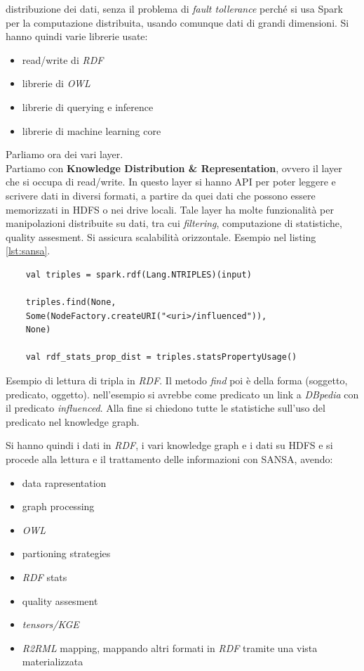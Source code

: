 \documentclass[a4paper,12pt, oneside]{book}
\begin{document}
distribuzione dei dati, senza il problema di \textit{fault tollerance} perché si
usa Spark per la computazione distribuita, usando comunque dati di grandi
dimensioni. Si hanno quindi varie librerie usate:
\begin{itemize}
  \item read/write di \textit{RDF}
  \item librerie di \textit{OWL}
  \item librerie di querying e inference
  \item librerie di machine learning core
\end{itemize}
Parliamo ora dei vari layer.\\
Partiamo con \textbf{Knowledge Distribution \& Representation}, ovvero il layer
che si occupa di read/write. In questo layer si hanno API per poter leggere e
scrivere dati in diversi formati, a partire da quei dati che possono essere
memorizzati in HDFS o nei drive locali. Tale layer ha molte funzionalità per
manipolazioni distribuite su dati, tra cui \textit{filtering}, computazione di
statistiche, quality assesment. Si assicura scalabilità orizzontale. Esempio nel
listing \ref{lst:sansa}.
\begin{listing}
  \begin{verbatim}
    val triples = spark.rdf(Lang.NTRIPLES)(input)
    
    triples.find(None,
    Some(NodeFactory.createURI("<uri>/influenced")),
    None)
    
    val rdf_stats_prop_dist = triples.statsPropertyUsage()
  \end{verbatim}
  \caption{Esempio di lettura di tripla in \textit{RDF}. Il metodo \textit{find}
    poi è della forma (soggetto, predicato, oggetto). nell'esempio si avrebbe
    come 
    predicato un link a \textit{DBpedia} con il predicato
    \textit{influenced}. Alla 
    fine si chiedono tutte le statistiche sull'uso del predicato nel knowledge
    graph.}
  \label{lst:sansa}
\end{listing}
Si hanno quindi i dati in \textit{RDF}, i vari knowledge graph e i dati su HDFS
e si procede alla lettura e il trattamento delle informazioni con SANSA, avendo:
\begin{itemize}
  \item data rapresentation
  \item graph processing
  \item \textit{OWL}
  \item partioning strategies
  \item \textit{RDF} stats
  \item quality assesment
  \item \textit{tensors/KGE}
  \item \textit{R2RML} mapping, mappando altri formati in \textit{RDF} tramite
  una vista materializzata
\end{itemize}
\end{document}
